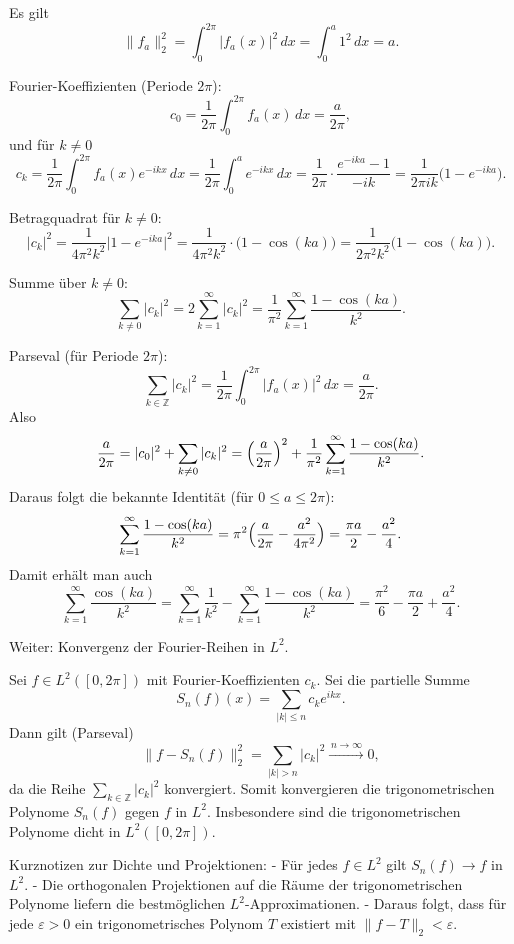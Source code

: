 \begin{beweisbox}
    Es gilt
    $$
    \|f_a\|_2^2=\int_{0}^{2\pi}|f_a(x)|^2\,dx=\int_{0}^{a}1^2\,dx=a.
    $$

    Fourier-Koeffizienten (Periode $2\pi$):
    $$
    c_0=\frac{1}{2\pi}\int_{0}^{2\pi}f_a(x)\,dx=\frac{a}{2\pi},
    $$
    und für $k\neq 0$
    $$
    c_k=\frac{1}{2\pi}\int_{0}^{2\pi}f_a(x)e^{-ikx}\,dx
    =\frac{1}{2\pi}\int_{0}^{a}e^{-ikx}\,dx
    =\frac{1}{2\pi}\cdot\frac{e^{-ika}-1}{-ik}
    =\frac{1}{2\pi ik}\bigl(1-e^{-ika}\bigr).
    $$

    Betragquadrat für $k\neq0$:
    $$
    |c_k|^2=\frac{1}{4\pi^2k^2}\bigl|1-e^{-ika}\bigr|^2
    =\frac{1}{4\pi^2k^2}\cdot \bigl(1-\cos(ka)\bigr)
    =\frac{1}{2\pi^2k^2}\bigl(1-\cos(ka)\bigr).
    $$

    Summe über $k\neq0$:
    $$
    \sum_{k\neq0}|c_k|^2
    =2\sum_{k=1}^{\infty}|c_k|^2
    =\frac{1}{\pi^2}\sum_{k=1}^{\infty}\frac{1-\cos(ka)}{k^2}.
    $$

    Parseval (für Periode $2\pi$):
    $$
    \sum_{k\in\mathbb{Z}}|c_k|^2=\frac{1}{2\pi}\int_{0}^{2\pi}|f_a(x)|^2\,dx=\frac{a}{2\pi}.
    $$
    Also
    $$
    \frac{a}{2\pi}=|c_0|^2+\sum_{k\neq0}|c_k|^2
    =\Bigl(\frac{a}{2\pi}\Bigr)^2+\frac{1}{\pi^2}\sum_{k=1}^{\infty}\frac{1-\cos(ka)}{k^2}.
    $$
    Daraus folgt die bekannte Identität (für $0\le a\le 2\pi$):
    $$
    \sum_{k=1}^{\infty}\frac{1-\cos(ka)}{k^2}
    =\pi^2\Bigl(\frac{a}{2\pi}-\frac{a^2}{4\pi^2}\Bigr)
    =\frac{\pi a}{2}-\frac{a^2}{4}.
    $$
    Damit erhält man auch
    $$
    \sum_{k=1}^{\infty}\frac{\cos(ka)}{k^2}
    =\sum_{k=1}^{\infty}\frac{1}{k^2}-\sum_{k=1}^{\infty}\frac{1-\cos(ka)}{k^2}
    =\frac{\pi^2}{6}-\frac{\pi a}{2}+\frac{a^2}{4}.
    $$

    Weiter: Konvergenz der Fourier-Reihen in $L^2$.

    Sei $f\in L^2([0,2\pi])$ mit Fourier-Koeffizienten $c_k$. Sei die partielle Summe
    $$
    S_n(f)(x)=\sum_{|k|\le n}c_k e^{ikx}.
    $$
    Dann gilt (Parseval)
    $$
    \|f-S_n(f)\|_2^2=\sum_{|k|>n}|c_k|^2\xrightarrow{\,n\to\infty\,}0,
    $$
    da die Reihe $\sum_{k\in\mathbb{Z}}|c_k|^2$ konvergiert. Somit konvergieren die trigonometrischen Polynome $S_n(f)$ gegen $f$ in $L^2$. Insbesondere sind die trigonometrischen Polynome dicht in $L^2([0,2\pi])$.

    Kurznotizen zur Dichte und Projektionen:
    - Für jedes $f\in L^2$ gilt $S_n(f)\to f$ in $L^2$.
    - Die orthogonalen Projektionen auf die Räume der trigonometrischen Polynome liefern die bestmöglichen $L^2$-Approximationen.
    - Daraus folgt, dass für jede $\varepsilon>0$ ein trigonometrisches Polynom $T$ existiert mit $\|f-T\|_2<\varepsilon$.
\end{beweisbox}

